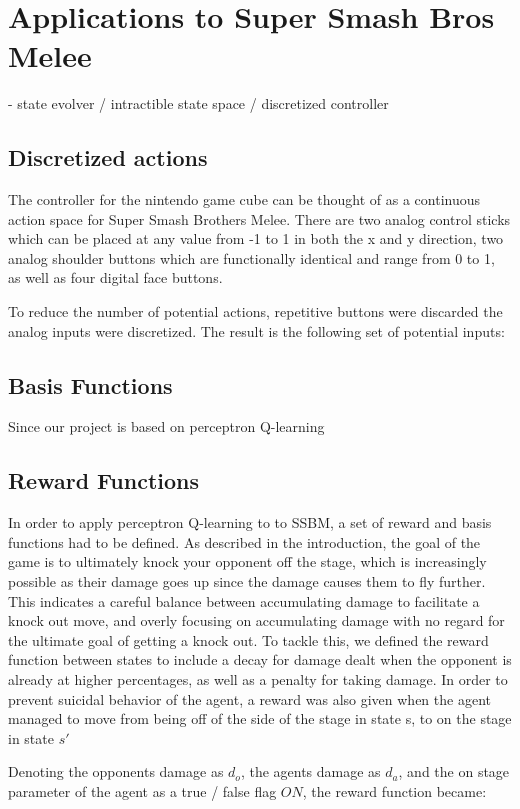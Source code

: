 \section{Applications to Super Smash Bros Melee}
- state evolver / intractible state space / discretized controller
\subsection{Discretized actions}
The controller for the nintendo game cube can be thought of as a continuous action space for Super Smash Brothers Melee. There are two analog control sticks which can be placed at any value from -1 to 1 in both the x and y direction, two analog shoulder buttons which are functionally identical and range from 0 to 1, as well as four digital face buttons. 

To reduce the number of potential actions, repetitive buttons were discarded the analog inputs were discretized. The result is the following set of potential inputs:

\subsection{Basis Functions}
Since our project is based on perceptron Q-learning 

\subsection{Reward Functions}

In order to apply perceptron Q-learning to to SSBM, a set of reward and basis functions had to be defined. As described in the introduction, the goal of the game is to ultimately knock your opponent off the stage, which is increasingly possible as their damage goes up since the damage causes them to fly further. This indicates a careful balance between accumulating damage to facilitate a knock out move, and overly focusing on accumulating damage with no regard for the ultimate goal of getting a knock out. To tackle this, we defined the reward function between states to include a decay for damage dealt when the opponent is already at higher percentages, as well as a penalty for taking damage. In order to prevent suicidal behavior of the agent, a reward was also given when the agent managed to move from being off of the side of the stage in state s, to on the stage in state $s'$

Denoting the opponents damage as $d_o$, the agents damage as $d_a$, and the on stage parameter of the agent as a true / false flag $ON$, the reward function became:

